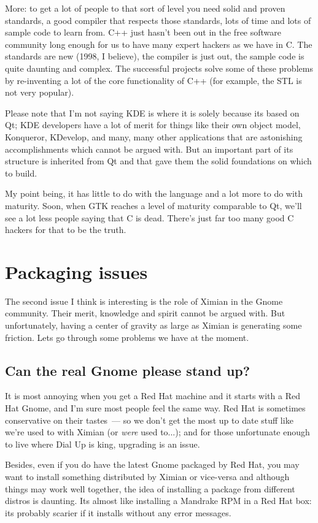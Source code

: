 \documentclass{memoir}
\begin{document}
More: to get a lot of people to that sort of level you need solid and
proven standards, a good compiler that respects those standards, lots
of time and lots of sample code to learn from. C++ just hasn't been
out in the free software community long enough for us to have many
expert hackers as we have in C. The standards are new (1998, I
believe), the compiler is just out, the sample code is quite daunting
and complex. The successful projects solve some of these problems by
re-inventing a lot of the core functionality of C++ (for example, the
STL is not very popular).

Please note that I'm not saying KDE is where it is solely because its
based on Qt; KDE developers have a lot of merit for things like their
own object model, Konqueror, KDevelop, and many, many other
applications that are astonishing accomplishments which cannot be
argued with. But an important part of its structure is inherited from
Qt and that gave them the solid foundations on which to build.

My point being, it has little to do with the language and a lot more
to do with maturity. Soon, when GTK reaches a level of maturity
comparable to Qt, we'll see a lot less people saying that C is
dead. There's just far too many good C hackers for that to be the
truth.

\section{Packaging issues}

The second issue I think is interesting is the role of Ximian in the
Gnome community. Their merit, knowledge and spirit cannot be argued
with. But unfortunately, having a center of gravity as large as Ximian
is generating some friction. Lets go through some problems we have at
the moment.

\subsection{Can the real Gnome please stand up?}

It is most annoying when you get a Red Hat machine and it starts with
a Red Hat Gnome, and I'm sure most people feel the same way. Red Hat
is sometimes conservative on their tastes~--- so we don't get the most
up to date stuff like we're used to with Ximian (or \emph{were} used
to...); and for those unfortunate enough to live where Dial Up is
king, upgrading is an issue.

Besides, even if you do have the latest Gnome packaged by Red Hat, you
may want to install something distributed by Ximian or vice-versa and
although things may work well together, the idea of installing a
package from different distros is daunting. Its almost like installing
a Mandrake RPM in a Red Hat box: its probably scarier if it installs
without any error messages.
\end{document}
